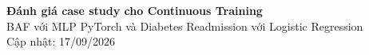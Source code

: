 \documentclass[11pt,a4paper]{article}
\begin{document}
\begin{center}
  {\Large\bfseries Đánh giá case study cho Continuous Training}\\[0.45em]
  BAF với MLP PyTorch và Diabetes Readmission với Logistic Regression\\[0.25em]
  {\small Cập nhật: 17/09/2026}
\end{center}









\end{document}
